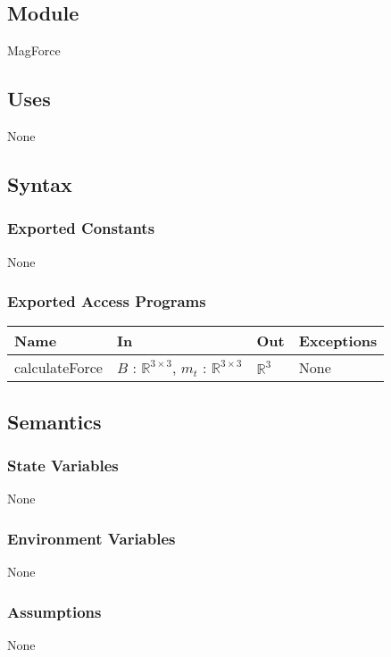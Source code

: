 \documentclass[12pt, titlepage]{article}
\begin{document}
\subsection{Module}
MagForce 

\subsection{Uses}
None

\subsection{Syntax}

\subsubsection{Exported Constants}
None 

\subsubsection{Exported Access Programs}
\begin{center}
  \begin{tabular}{p{3cm} p{4cm} p{4cm} p{3cm}}
  \hline
  \textbf{Name} & \textbf{In} & \textbf{Out} & \textbf{Exceptions} \\
  \hline
  calculateForce &  $B$ : $\mathbb{R}^{3 \times 3}$, $m_t$ : $\mathbb{R}^{3 \times 3}$ & $\mathbb{R}^3$ & None \\
  \hline
  \end{tabular}
  \end{center}

\subsection{Semantics}

\subsubsection{State Variables}
None

\subsubsection{Environment Variables}
None

\subsubsection{Assumptions}
None 
\end{document}
